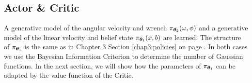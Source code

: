 \subsection{Actor \& Critic}

A generative model of the angular velocity and wrench $\pi_{\boldsymbol{\theta}_2}(\omega,\phi)$ and a generative model 
of the linear velocity and belief state $\pi_{\boldsymbol{\theta}_1}(\dot{x},b)$ are learned. 
The structure of $\pi_{\boldsymbol{\theta}_1}$ is the same as in Chapter 3 Section \ref{chap3:policies} on page \pageref{chap3:policies}. 
In both cases we use the Bayesian Information Criterion to determine the number of Gaussian functions.
In the next section, we will show how the parameters of $\pi_{\boldsymbol{\theta}_1}$ can be adapted by the value function of the Critic.


